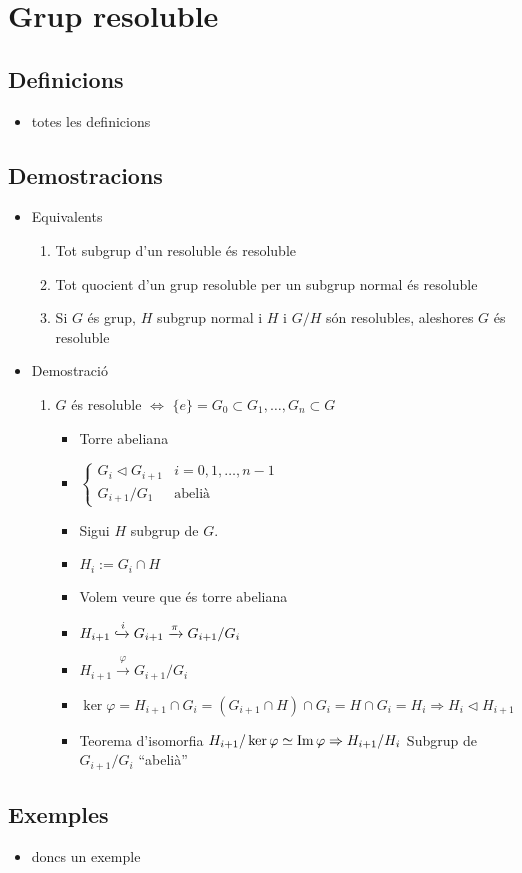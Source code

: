 \section{Grup resoluble}
\subsection*{Definicions}
\begin{itemize}
\item totes les definicions
\end{itemize}

\subsection*{Demostracions}
\begin{itemize}
\item Equivalents
	\begin{enumerate}
	\item Tot subgrup d'un resoluble és resoluble
	\item Tot quocient d'un grup resoluble per un subgrup normal és resoluble
	\item Si $G$ és grup, $H$ subgrup normal i $H$ i $G/H$ són resolubles, aleshores $G$ és resoluble
	\end{enumerate}
\item Demostració
	\begin{enumerate}
	\item $G$ és resoluble $\Leftrightarrow$ $\{e\} = G_0 \subset G_1, \dots, G_n \subset G$
		\begin{itemize}
		\item Torre abeliana
		\item
			$
			\begin{cases}
			G_i \triangleleft G_{i+1} & i = 0, 1, \dots, n -1\\
			G_{i+1}/G_1 &\text{abelià}
			\end{cases}
			$
		\item Sigui $H$ subgrup de $G$.
		\item $H_i:= G_i \cap H$
		\item Volem veure que és torre abeliana
		\item $H_{i+1} \xhookrightarrow{i} G_{i+1} \xrightarrow{\pi} G_{i+1}/G_i$
		\item $H_{i+1} \xrightarrow{\varphi} G_{i+1}/G_i$
		\item $\ker \varphi = H_{i+1} \cap G_i = (G_{i+1} \cap H) \cap G_i = H \cap G_i = H_i \Rightarrow H_i \triangleleft H_{i+1}$
		\item Teorema d'isomorfia
			\subitem $H_{i+1}/\ker \varphi \simeq \operatorname{Im} \varphi \Rightarrow H_{i+1}/H_i$ Subgrup de $G_{i+1}/G_i$ ``abelià''
		\end{itemize}
	\end{enumerate}
\end{itemize}

\subsection*{Exemples}
\begin{itemize}
\item doncs un exemple
\end{itemize}
